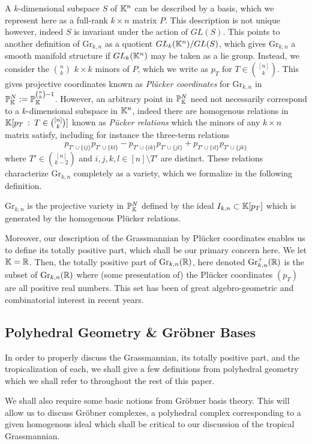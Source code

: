 \documentclass[12pt,letter]{article}
\newcommand{\gr}{\mathrm{Gr}}
\begin{document}
A $k$-dimensional subspace $S$ of ${\mathbb K}^n$ can be described by a basis, which we represent here as a full-rank $k\times n$ matrix $P$. This description is not unique however, indeed $S$ is invariant under the action of $GL(S)$. This points to another definition of $\gr_{k,n}$ as a quotient $GL_k({\mathbb K}^n)/GL(S)$, which gives $\gr_{k,n}$ a smooth manifold structure if $GL_k({\mathbb K}^n)$ may be taken as a lie group. Instead, we consider the $n\choose k$ $k\times k$ minors of $P$, which we write as $p_{T}$ for $T\in {[n]\choose k}$. This gives projective coordinates known as \emph{Pl\"ucker coordinates} for $\gr_{k,n}$ in ${\mathbb P}_{\mathbb K}^N:={\mathbb P}_{{\mathbb K}}^{{n\choose k}-1}$. However, an arbitrary point in ${\mathbb P}_{\mathbb K}^N$ need not necessarily correspond to a $k$-dimensional subspace in ${\mathbb K}^n$, indeed there are homogenous relations in ${\mathbb K}[p_T\::\:T\in {[n]\choose k}]$ known as \emph{P\"ucker relations} which the minors of any $k\times n$ matrix satisfy, including for instance the three-term relations $$p_{T'\cup\{ij\}}p_{T'\cup\{kl\}}-p_{T'\cup\{ik\}}p_{T'\cup\{jl\}}+p_{T'\cup\{il\}}p_{T'\cup\{jk\}}$$
where $T'\in {[n]\choose k-2}$ and $i,j,k,l\in [n]\setminus T'$ are distinct. These relations characterize $\gr_{k,n}$ completely as a variety, which we formalize in the following definition.
\begin{definition}
	$\gr_{k,n}$ is the projective variety in ${\mathbb P}_{{\mathbb K}}^{N}$ defined by the ideal  $I_{k,n}\subset {\mathbb K}[p_T]$ which is generated by the homogenous Pl\"ucker relations.
\end{definition}

Moreover, our description of the Grassmannian by Pl\"ucker coordinates enables us to define its totally positive part, which shall be our primary concern here. We let ${\mathbb K}={\mathbb R}$. Then, the totally positive part of $\gr_{k,n} (\RR)$, here denoted $\gr_{k,n}^+(\RR)$ is the subset of $\gr_{k,n}(\RR)$ where (some presentation of) the Pl\"ucker coordinates $(p_T)$ are all positive real numbers. This set has been of great algebro-geometric and combinatorial interest in recent years.
\subsection{Polyhedral Geometry \& Gr\"obner Bases}
In order to properly discuss the Grassmannian, its totally positive part, and the tropicalization of each, we shall give a few definitions from polyhedral geometry which we shall refer to throughout the rest of this paper.
\begin{definition}
\end{definition}
\begin{definition}
\end{definition}
We shall also require some basic notions from Gr\"obner basis theory. This will allow us to discuss Gr\"obner complexes, a polyhedral complex corresponding to a given homogenous ideal which shall be critical to our discussion of the tropical Grassmannian.
\begin{definition}
\end{definition}
\end{document}
